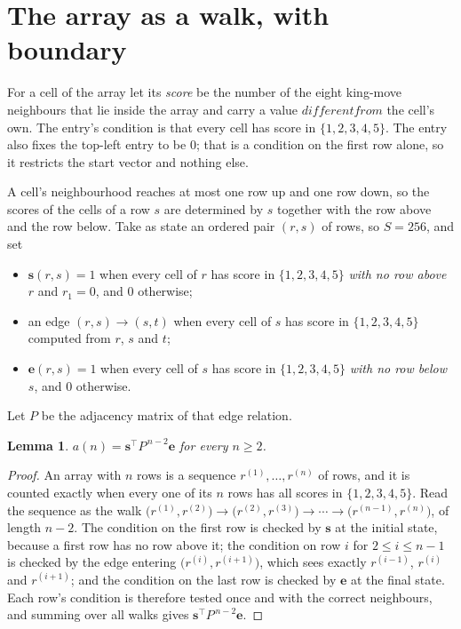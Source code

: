 \documentclass[11pt,a4paper]{article}
\theoremstyle{plain}
\newtheorem{lemma}[theorem]{Lemma}
\theoremstyle{definition}
\begin{document}
\section{The array as a walk, with boundary}

For a cell of the array let its \emph{score} be the number of the eight king-move neighbours that lie inside
the array and carry a value $different from$ the cell's own. The entry's condition is that every cell
has score in $\{1,2,3,4,5\}$. The entry also fixes the top-left entry to be $0$; that is a condition on the first row alone, so it restricts the start vector and nothing else.

A cell's neighbourhood reaches at most one row up and one row down, so the scores of the
cells of a row $s$ are determined by $s$ together with the row above and the row below.
Take as state an ordered pair $(r,s)$ of rows, so $S=256$, and set
\begin{itemize}
\item $\mathbf{s}(r,s)=1$ when every cell of $r$ has score in $\{1,2,3,4,5\}$ \emph{with no row
above $r$} and $r_1=0$, and $0$ otherwise;
\item an edge $(r,s)\to(s,t)$ when every cell of $s$ has score in $\{1,2,3,4,5\}$ computed from
$r$, $s$ and $t$;
\item $\mathbf{e}(r,s)=1$ when every cell of $s$ has score in $\{1,2,3,4,5\}$ \emph{with no row
below $s$}, and $0$ otherwise.
\end{itemize}
Let $P$ be the adjacency matrix of that edge relation.

\begin{lemma}\label{lem:walk}
$a(n)=\mathbf{s}^{\!\top}P^{\,n-2}\mathbf{e}$ for every $n\ge2$.
\end{lemma}

\begin{proof}
An array with $n$ rows is a sequence $r^{(1)},\dots,r^{(n)}$ of rows, and it is counted
exactly when every one of its $n$ rows has all scores in $\{1,2,3,4,5\}$. Read the sequence as the
walk $\bigl(r^{(1)},r^{(2)}\bigr)\to\bigl(r^{(2)},r^{(3)}\bigr)\to\cdots\to
\bigl(r^{(n-1)},r^{(n)}\bigr)$, of length $n-2$. The condition on the first row is
checked by $\mathbf{s}$ at the initial state, because a first row has no row above it; the
condition on row $i$ for $2\le i\le n-1$ is checked by the edge entering
$\bigl(r^{(i)},r^{(i+1)}\bigr)$, which sees exactly $r^{(i-1)}$, $r^{(i)}$ and
$r^{(i+1)}$; and the condition on the last row is checked by $\mathbf{e}$ at the final
state. Each row's condition is therefore tested once and with the correct neighbours, and
summing over all walks gives $\mathbf{s}^{\!\top}P^{\,n-2}\mathbf{e}$.
\end{proof}
\end{document}
